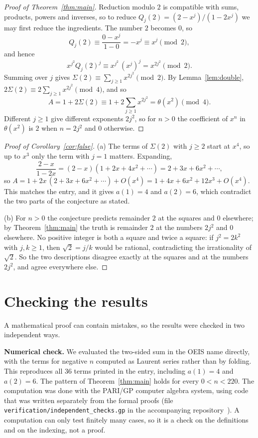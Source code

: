 \documentclass[11pt,a4paper]{article}
\theoremstyle{definition}
\theoremstyle{remark}
\newcommand{\para}[1]{\par\medskip\noindent\textbf{#1}\enspace}
\begin{document}
\begin{proof}[Proof of Theorem~\ref{thm:main}]
Reduction modulo $2$ is compatible with sums, products, powers and inverses, so to reduce
$Q_j(2)=(2-x^j)/(1-2x^j)$ we may first reduce the ingredients. The number $2$ becomes $0$, so
\[
Q_j(2)\equiv\frac{0-x^j}{1-0}=-x^j\equiv x^j\pmod 2,
\]
and hence
\[
x^{j^2}Q_j(2)^j\equiv x^{j^2}\,(x^j)^j=x^{2j^2}\pmod 2 .
\]
Summing over $j$ gives $\Sigma(2)\equiv\sum_{j\ge1}x^{2j^2}\pmod2$. By Lemma~\ref{lem:double},
$2\Sigma(2)\equiv2\sum_{j\ge1}x^{2j^2}\pmod4$, and so
\[
A=1+2\Sigma(2)\equiv1+2\sum_{j\ge1}x^{2j^2}=\theta(x^2)\pmod 4 .
\]
Different $j\ge1$ give different exponents $2j^2$, so for $n>0$ the coefficient of $x^n$ in $\theta(x^2)$ is $2$ when
$n=2j^2$ and $0$ otherwise.
\end{proof}

\begin{proof}[Proof of Corollary~\ref{cor:false}]
(a) The terms of $\Sigma(2)$ with $j\ge2$ start at $x^4$, so up to $x^3$ only the term with $j=1$ matters. Expanding,
\[
\frac{2-x}{1-2x}=(2-x)(1+2x+4x^2+\cdots)=2+3x+6x^2+\cdots,
\]
so $A=1+2x\,(2+3x+6x^2+\cdots)+O(x^4)=1+4x+6x^2+12x^3+O(x^4)$. This matches the entry, and it gives $a(1)=4$ and
$a(2)=6$, which contradict the two parts of the conjecture as stated.

(b) For $n>0$ the conjecture predicts remainder $2$ at the squares and $0$ elsewhere; by Theorem~\ref{thm:main} the
truth is remainder $2$ at the numbers $2j^2$ and $0$ elsewhere. No positive integer is both a square and twice a
square: if $j^2=2k^2$ with $j,k\ge1$, then $\sqrt2=j/k$ would be rational, contradicting the irrationality of $\sqrt2$. So the two
descriptions disagree exactly at the squares and at the numbers $2j^2$, and agree everywhere else.
\end{proof}

\section{Checking the results}\label{sec:checks}

A mathematical proof can contain mistakes, so the results were checked in two independent ways.

\para{Numerical check.}
We evaluated the two-sided sum in the OEIS name directly, with the terms for negative $n$ computed as Laurent
series rather than by folding. This reproduces all 36 terms printed in the entry, including $a(1)=4$ and $a(2)=6$. The
pattern of Theorem~\ref{thm:main} holds for every $0<n<220$.
The computation was done with the PARI/GP computer algebra system, using code that was written separately from the
formal proofs (file \texttt{verification/independent\_checks.gp} in the accompanying repository~\cite{repo}).
A computation can only test finitely many cases, so it is a check on the definitions and on the indexing, not a proof.
\end{document}
